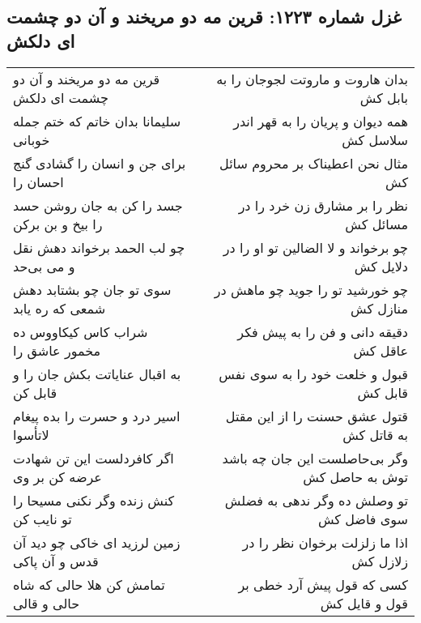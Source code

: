 \begin{center}
\section*{غزل شماره ۱۲۲۳: قرین مه دو مریخند و آن دو چشمت ای دلکش}
\label{sec:1223}
\begin{longtable}{l p{0.5cm} r}
قرین مه دو مریخند و آن دو چشمت ای دلکش
&&
بدان هاروت و ماروتت لجوجان را به بابل کش
\\
سلیمانا بدان خاتم که ختم جمله خوبانی
&&
همه دیوان و پریان را به قهر اندر سلاسل کش
\\
برای جن و انسان را گشادی گنج احسان را
&&
مثال نحن اعطیناک بر محروم سائل کش
\\
جسد را کن به جان روشن حسد را بیخ و بن برکن
&&
نظر را بر مشارق زن خرد را در مسائل کش
\\
چو لب الحمد برخواند دهش نقل و می بی‌حد
&&
چو برخواند و لا الضالین تو او را در دلایل کش
\\
سوی تو جان چو بشتابد دهش شمعی که ره یابد
&&
چو خورشید تو را جوید چو ماهش در منازل کش
\\
شراب کاس کیکاووس ده مخمور عاشق را
&&
دقیقه دانی و فن را به پیش فکر عاقل کش
\\
به اقبال عنایاتت بکش جان را و قابل کن
&&
قبول و خلعت خود را به سوی نفس قابل کش
\\
اسیر درد و حسرت را بده پیغام لاتأسوا
&&
قتول عشق حسنت را از این مقتل به قاتل کش
\\
اگر کافردلست این تن شهادت عرضه کن بر وی
&&
وگر بی‌حاصلست این جان چه باشد توش به حاصل کش
\\
کنش زنده وگر نکنی مسیحا را تو نایب کن
&&
تو وصلش ده وگر ندهی به فضلش سوی فاضل کش
\\
زمین لرزید ای خاکی چو دید آن قدس و آن پاکی
&&
اذا ما زلزلت برخوان نظر را در زلازل کش
\\
تمامش کن هلا حالی که شاه حالی و قالی
&&
کسی که قول پیش آرد خطی بر قول و قایل کش
\\
\end{longtable}
\end{center}
